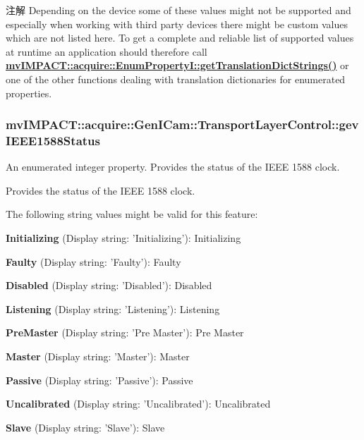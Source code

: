 \begin{DoxyNote}{注解}
Depending on the device some of these values might not be supported and especially when working with third party devices there might be custom values which are not listed here. To get a complete and reliable list of supported values at runtime an application should therefore call {\bfseries \hyperlink{classmv_i_m_p_a_c_t_1_1acquire_1_1_enum_property_i_a0ba6ccbf5ee69784d5d0b537924d26b6}{mv\+I\+M\+P\+A\+C\+T\+::acquire\+::\+Enum\+Property\+I\+::get\+Translation\+Dict\+Strings()}} or one of the other functions dealing with translation dictionaries for enumerated properties. 
\end{DoxyNote}
\hypertarget{classmv_i_m_p_a_c_t_1_1acquire_1_1_gen_i_cam_1_1_transport_layer_control_a2fe87e552155f59ea88677aad321dc9b}{
\subsubsection[{gev\+I\+E\+E\+E1588\+Status}]{ mv\+I\+M\+P\+A\+C\+T\+::acquire\+::\+Gen\+I\+Cam\+::\+Transport\+Layer\+Control\+::gev\+I\+E\+E\+E1588\+Status}}\label{classmv_i_m_p_a_c_t_1_1acquire_1_1_gen_i_cam_1_1_transport_layer_control_a2fe87e552155f59ea88677aad321dc9b}


An enumerated integer property. Provides the status of the I\+E\+E\+E 1588 clock. 

Provides the status of the I\+E\+E\+E 1588 clock.

The following string values might be valid for this feature\+:
\begin{DoxyItemize}
\item {\bfseries Initializing} (Display string\+: 'Initializing')\+: Initializing
\item {\bfseries Faulty} (Display string\+: 'Faulty')\+: Faulty
\item {\bfseries Disabled} (Display string\+: 'Disabled')\+: Disabled
\item {\bfseries Listening} (Display string\+: 'Listening')\+: Listening
\item {\bfseries Pre\+Master} (Display string\+: 'Pre Master')\+: Pre Master
\item {\bfseries Master} (Display string\+: 'Master')\+: Master
\item {\bfseries Passive} (Display string\+: 'Passive')\+: Passive
\item {\bfseries Uncalibrated} (Display string\+: 'Uncalibrated')\+: Uncalibrated
\item {\bfseries Slave} (Display string\+: 'Slave')\+: Slave
\end{DoxyItemize}

